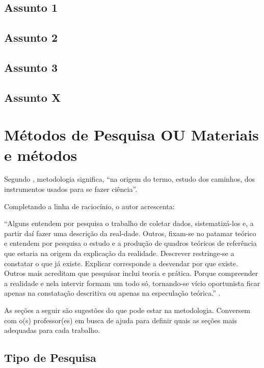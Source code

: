 \documentclass[
	article,			%
	12pt,				%
	oneside,			%
	a4paper,			%
	english,			%
	brazil,				%
	sumario=tradicional
	]{abntex2}
\begin{document}
\subsection{Assunto 1}
\lipsum[1]
\subsection{Assunto 2}
\lipsum[1]
\subsection{Assunto 3}
\lipsum[1]
\subsection{Assunto X}
\lipsum[1]


\section{Métodos de Pesquisa OU Materiais e métodos}

Segundo , metodologia significa, “na origem do termo, estudo dos caminhos, dos instrumentos usados para se fazer ciência”.

Completando a linha de raciocínio, o autor acrescenta:

    \begin{citacao}
    “Alguns entendem por pesquisa o trabalho de coletar dados, sistematizá-los e, a partir daí fazer uma descrição da real-dade. Outros, fixam-se no patamar teórico e entendem por pesquisa o estudo e a produção de quadros teóricos de referência que estaria na origem da explicação da realidade. Descrever restringe-se a constatar o que já existe. Explicar corresponde a desvendar por que existe. Outros mais acreditam que pesquisar inclui teoria e prática. Porque compreender a realidade e nela intervir formam um todo só, tornando-se vício oportunista ficar apenas na constatação descritiva ou apenas na especulação teórica.”
    \lipsum[5] \cite{PESQUISA:DEMO}.
    \end{citacao}



As seções a seguir são sugestões do que pode estar na metodologia. Conversem com o(s) professor(es) em busca de ajuda para definir quais as seções mais adequadas para cada trabalho.

\subsection{Tipo de Pesquisa}
\lipsum[1]
\end{document}
